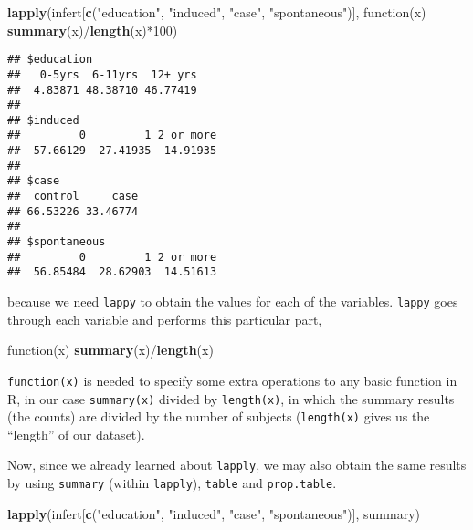 \documentclass[]{book}
\newenvironment{Shaded}{\begin{snugshade}}{\end{snugshade}}
\newcommand{\KeywordTok}[1]{\textcolor[rgb]{0.13,0.29,0.53}{\textbf{{#1}}}}
\newcommand{\DecValTok}[1]{\textcolor[rgb]{0.00,0.00,0.81}{{#1}}}
\newcommand{\StringTok}[1]{\textcolor[rgb]{0.31,0.60,0.02}{{#1}}}
\newcommand{\NormalTok}[1]{{#1}}
\theoremstyle{definition}
\theoremstyle{definition}
\theoremstyle{remark}
\begin{document}
\begin{Shaded}
\begin{Highlighting}[]
\KeywordTok{lapply}\NormalTok{(infert[}\KeywordTok{c}\NormalTok{(}\StringTok{"education"}\NormalTok{, }\StringTok{"induced"}\NormalTok{, }\StringTok{"case"}\NormalTok{, }\StringTok{"spontaneous"}\NormalTok{)], }
       \NormalTok{function(x) }\KeywordTok{summary}\NormalTok{(x)/}\KeywordTok{length}\NormalTok{(x)*}\DecValTok{100}\NormalTok{)}
\end{Highlighting}
\end{Shaded}

\begin{verbatim}
## $education
##   0-5yrs  6-11yrs  12+ yrs 
##  4.83871 48.38710 46.77419 
## 
## $induced
##         0         1 2 or more 
##  57.66129  27.41935  14.91935 
## 
## $case
##  control     case 
## 66.53226 33.46774 
## 
## $spontaneous
##         0         1 2 or more 
##  56.85484  28.62903  14.51613
\end{verbatim}

because we need \texttt{lappy} to obtain the values for each of the
variables. \texttt{lappy} goes through each variable and performs this
particular part,

\begin{Shaded}
\begin{Highlighting}[]
\NormalTok{function(x) }\KeywordTok{summary}\NormalTok{(x)/}\KeywordTok{length}\NormalTok{(x)}
\end{Highlighting}
\end{Shaded}

\texttt{function(x)} is needed to specify some extra operations to any
basic function in R, in our case \texttt{summary(x)} divided by
\texttt{length(x)}, in which the summary results (the counts) are
divided by the number of subjects (\texttt{length(x)} gives us the
``length'' of our dataset).

Now, since we already learned about \texttt{lapply}, we may also obtain
the same results by using \texttt{summary} (within \texttt{lapply}),
\texttt{table} and \texttt{prop.table}.

\begin{Shaded}
\begin{Highlighting}[]
\KeywordTok{lapply}\NormalTok{(infert[}\KeywordTok{c}\NormalTok{(}\StringTok{"education"}\NormalTok{, }\StringTok{"induced"}\NormalTok{, }\StringTok{"case"}\NormalTok{, }\StringTok{"spontaneous"}\NormalTok{)], summary)}
\end{Highlighting}
\end{Shaded}
\end{document}
